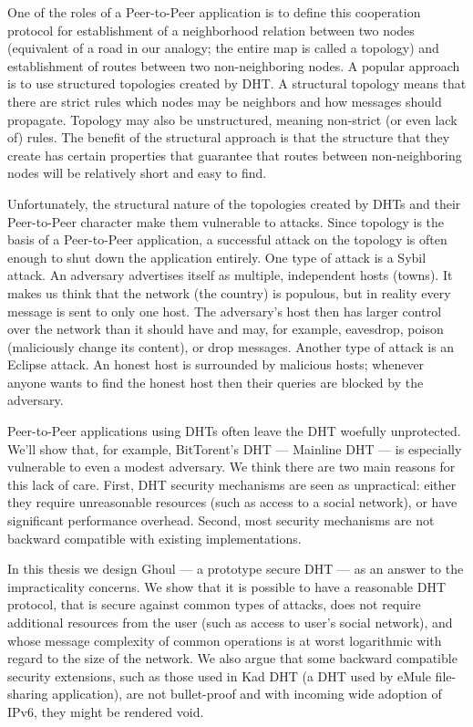 One of the roles of a Peer-to-Peer application is to define this cooperation
protocol for establishment of a neighborhood relation between two nodes
(equivalent of a road in our analogy; the entire map is called a topology) and
establishment of routes between two non-neighboring nodes.
A popular approach is to use structured topologies created by DHT.
A structural topology means that there are strict rules which nodes may be
neighbors and how messages should propagate.
Topology may also be unstructured, meaning non-strict (or even lack of) rules.
The benefit of the structural approach is that the structure that they create
has certain properties that guarantee that routes between non-neighboring nodes
will be relatively short and easy to find.

Unfortunately, the structural nature of the topologies created by DHTs and
their Peer-to-Peer character make them vulnerable to attacks.
Since topology is the basis of a Peer-to-Peer application, a successful attack
on the topology is often enough to shut down the application entirely.
One type of attack is a Sybil attack.
An adversary advertises itself as multiple, independent hosts (towns).
It makes us think that the network (the country) is populous, but in reality
every message is sent to only one host.
The adversary's host then has larger control over the network than it should
have and may, for example, eavesdrop, poison (maliciously change its content),
or drop messages.
Another type of attack is an Eclipse attack.
An honest host is surrounded by malicious hosts; whenever anyone wants to find
the honest host then their queries are blocked by the adversary.

Peer-to-Peer applications using DHTs often leave the DHT woefully unprotected.
We'll show that, for example, BitTorent's DHT --- Mainline DHT --- is especially
vulnerable to even a modest adversary.
We think there are two main reasons for this lack of care.
First, DHT security mechanisms are seen as unpractical: either they require
unreasonable resources (such as access to a social network), or have significant
performance overhead.
Second, most security mechanisms are not backward compatible with existing
implementations.

In this thesis we design Ghoul --- a prototype secure DHT ---
as an answer to the impracticality concerns.
We show that it is possible to have a reasonable DHT protocol, that is secure
against common types of attacks, does not require additional resources from the
user (such as access to user's social network), and whose message complexity of
common operations is at worst logarithmic with regard to the size of the
network.
We also argue that some backward compatible security extensions, such as those
used in Kad DHT (a DHT used by eMule file-sharing application), are not
bullet-proof and with incoming wide adoption of IPv6, they might be rendered
void.

